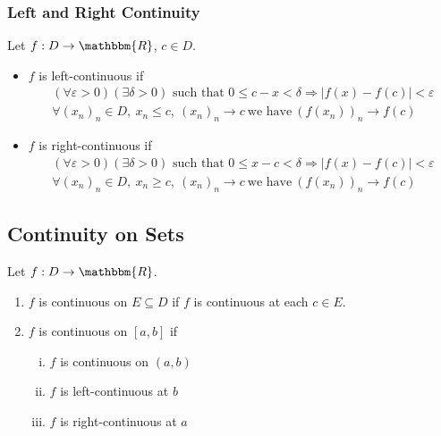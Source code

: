 \documentclass[10pt]{extarticle}
\newcommand{\R}{\mathbbm{R}}
\begin{document}
    \subsubsection{Left and Right Continuity}%
    Let $f: D\rightarrow \R$, $c\in D$.
    \begin{itemize}
      \item $f$ is left-continuous if
        \begin{align*}
          (\forall \varepsilon > 0)(\exists \delta > 0) \text{ such that } 0\leq c-x < \delta \Rightarrow |f(x) - f(c)| < \varepsilon\\
          \forall (x_n)_n \in D,~x_n \leq c,~(x_n)_n \rightarrow c~\text{we have}~\left(f(x_n)\right)_n \rightarrow f(c)
        \end{align*}
      \item $f$ is right-continuous if
        \begin{align*}
          (\forall \varepsilon > 0)(\exists \delta > 0) \text{ such that } 0\leq x-c < \delta \Rightarrow |f(x) - f(c)| < \varepsilon\\
          \forall (x_n)_n \in D,~x_n \geq c,~(x_n)_n \rightarrow c~\text{we have}~\left(f(x_n)\right)_n \rightarrow f(c)
        \end{align*}
    \end{itemize}
  \subsection{Continuity on Sets}%
    Let $f: D\rightarrow \R$.
    \begin{enumerate}[(1)]
      \item $f$ is continuous on $E\subseteq D$ if $f$ is continuous at each $c\in E$.
      \item $f$ is continuous on $[a,b]$ if
        \begin{enumerate}[(i)]
          \item $f$ is continuous on $(a,b)$
          \item $f$ is left-continuous at $b$
          \item $f$ is right-continuous at $a$
        \end{enumerate}
    \end{enumerate}
\end{document}
